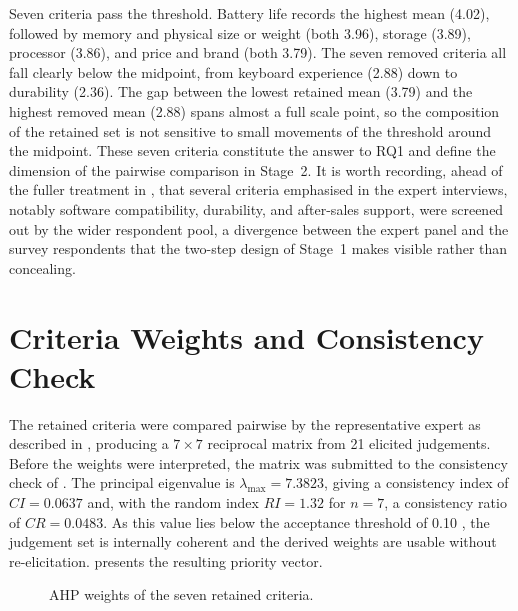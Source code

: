Seven criteria pass the threshold. Battery life records the highest mean (4.02), followed
by memory and physical size or weight (both 3.96), storage (3.89), processor (3.86), and
price and brand (both 3.79). The seven removed criteria all fall clearly below the
midpoint, from keyboard experience (2.88) down to durability (2.36). The gap between the
lowest retained mean (3.79) and the highest removed mean (2.88) spans almost a full scale
point, so the composition of the retained set is not sensitive to small movements of the
threshold around the midpoint. These seven criteria constitute the answer to RQ1 and
define the dimension of the pairwise comparison in Stage~2. It is worth recording, ahead
of the fuller treatment in , that several criteria emphasised in the
expert interviews, notably software compatibility, durability, and after-sales support,
were screened out by the wider respondent pool, a divergence between the expert panel and
the survey respondents that the two-step design of Stage~1 makes visible rather than
concealing.

\section{Criteria Weights and Consistency Check}\label{sec:weights}

The retained criteria were compared pairwise by the representative expert as described in
, producing a $7 \times 7$ reciprocal matrix from 21 elicited judgements.
Before the weights were interpreted, the matrix was submitted to the consistency check of
. The principal eigenvalue is $\lambda_{\max} = 7.3823$, giving a consistency
index of $CI = 0.0637$ and, with the random index $RI = 1.32$ for $n = 7$, a consistency
ratio of $CR = 0.0483$. As this value lies below the acceptance threshold of 0.10
\parencite{Saaty2008DECISIONMW}, the judgement set is internally coherent and the derived
weights are usable without re-elicitation.  presents the resulting
priority vector.



\begin{figure}[H]
  \centering
  \caption{AHP weights of the seven retained criteria.}
  \label{fig:ahp-weights}
\end{figure}

